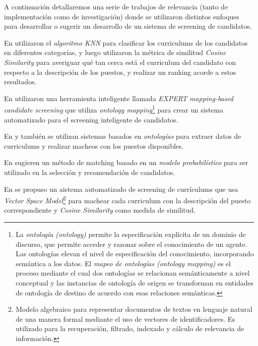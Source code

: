 \documentclass[12pt,a4paper]{article}
\begin{document}
\begin{sloppypar}
A continuación detallaremos una serie de trabajos de relevancia (tanto de implementación como de investigación) donde se utilizaron distintos enfoques para desarrollar o sugerir un desarrollo de un sistema de screening de candidatos.

En \cite{trabajos_relacionados_1} utilizaron el \textit{algoritmo KNN} para clasificar los curriculums de los candidatos en diferentes categorías, y luego utilizaron la métrica de similitud \textit{Cosine Similarity} para averiguar qué tan cerca está el curriculum del candidato con respecto a la descripción de los puestos, y realizar un ranking acorde a estos resultados.

En \cite{trabajos_relacionados_2} utilizaron una herramienta inteligente llamada \textit{EXPERT mapping-based candidate screening} que utiliza  \textit{ontology mapping}\footnote{La \textit{ontología (ontology)} permite la especificación explícita de un dominio de discurso, que permite acceder y razonar sobre el conocimiento de un agente. Las ontologías elevan el nivel de especificación del conocimiento, incorporando semántica a los datos.
El \textit{mapeo de ontologías (ontology mapping)} es el proceso mediante el cual dos ontologías se relacionan semánticamente a nivel conceptual y las instancias de ontología de origen se transforman en entidades de ontología de destino de acuerdo con esas relaciones semánticas.\cite{ontology_mapping} } para crear un sistema automatizado para el screening inteligente de candidatos. 

En \cite{trabajos_relacionados_3} y \cite{trabajos_relacionados_4} también se utilizan sistemas basados en \textit{ontologías} para extraer datos de curriculums y realizar macheos con los puestos disponibles.

En \cite{trabajos_relacionados_5} sugieren un método de matching basado en un \textit{modelo probabilístico} para ser utilizado en la selección y recomendación de candidatos. 

En \cite{trabajos_relacionados_6} se propuso un aistema automatizado de screening de currículums que usa \textit{Vector Space Model}\footnote{Modelo algebraico para representar documentos de textos en lenguaje natural de una manera formal mediante el uso de vectores de identificadores. Es utilizado para la recuperación, filtrado, indexado y cálculo de relevancia de información.} para machear cada curriculum con la descripción del puesto correspondiente y \textit{Cosine Similarity} como medida de similitud.

\cleardoublepage    %


\end{sloppypar}
\end{document}
